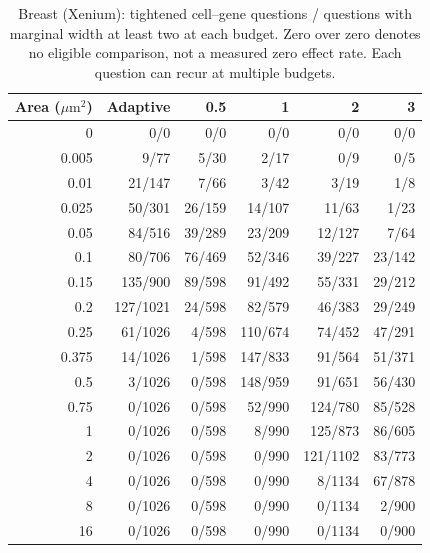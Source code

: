 \begin{table}[ht]\centering
\begin{tabular}{rrrrrr}\toprule
Area ($\mu\mathrm m^2$)&Adaptive&0.5&1&2&3\\\midrule
0 & 0/0 & 0/0 & 0/0 & 0/0 & 0/0\\
0.005 & 9/77 & 5/30 & 2/17 & 0/9 & 0/5\\
0.01 & 21/147 & 7/66 & 3/42 & 3/19 & 1/8\\
0.025 & 50/301 & 26/159 & 14/107 & 11/63 & 1/23\\
0.05 & 84/516 & 39/289 & 23/209 & 12/127 & 7/64\\
0.1 & 80/706 & 76/469 & 52/346 & 39/227 & 23/142\\
0.15 & 135/900 & 89/598 & 91/492 & 55/331 & 29/212\\
0.2 & 127/1021 & 24/598 & 82/579 & 46/383 & 29/249\\
0.25 & 61/1026 & 4/598 & 110/674 & 74/452 & 47/291\\
0.375 & 14/1026 & 1/598 & 147/833 & 91/564 & 51/371\\
0.5 & 3/1026 & 0/598 & 148/959 & 91/651 & 56/430\\
0.75 & 0/1026 & 0/598 & 52/990 & 124/780 & 85/528\\
1 & 0/1026 & 0/598 & 8/990 & 125/873 & 86/605\\
2 & 0/1026 & 0/598 & 0/990 & 121/1102 & 83/773\\
4 & 0/1026 & 0/598 & 0/990 & 8/1134 & 67/878\\
8 & 0/1026 & 0/598 & 0/990 & 0/1134 & 2/900\\
16 & 0/1026 & 0/598 & 0/990 & 0/1134 & 0/900\\
\bottomrule\end{tabular}
\caption{Breast (Xenium): tightened cell--gene questions / questions with marginal width at least two at each budget. Zero over zero denotes no eligible comparison, not a measured zero effect rate. Each question can recur at multiple budgets.}
\end{table}
